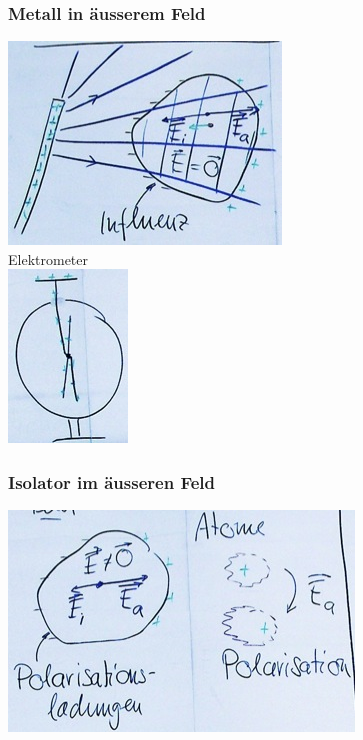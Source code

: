 \subsubsection{Metall in äusserem Feld}
\includegraphics{Bild168} \\
Elektrometer \\
\includegraphics{Bild169}

\subsubsection{Isolator im äusseren Feld}
\includegraphics{Bild170}

